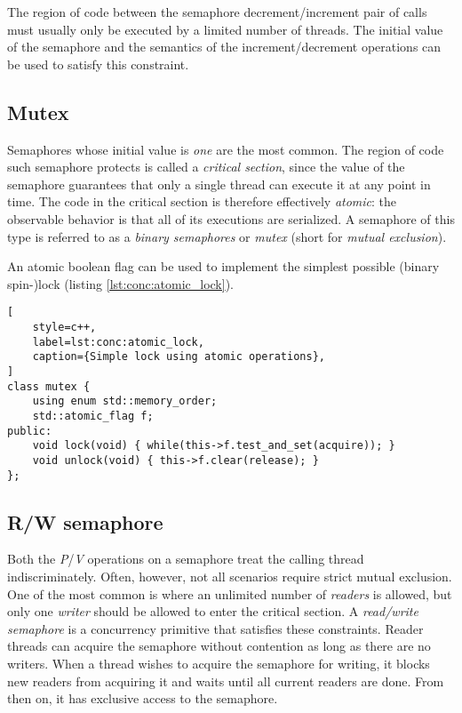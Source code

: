 The region of code between the semaphore decrement/increment pair of calls must
usually only be executed by a limited number of threads.  The initial value of
the semaphore and the semantics of the increment/decrement operations can be
used to satisfy this constraint.

\subsection{Mutex}

\label{subsec:conc:mutex}

Semaphores whose initial value is \emph{one} are the most common.  The region of
code such semaphore protects is called a \textit{critical section}, since the
value of the semaphore guarantees that only a single thread can execute it at
any point in time.  The code in the critical section is therefore effectively
\emph{atomic}: the observable behavior is that all of its executions are
serialized.  A semaphore of this type is referred to as a \textit{binary
semaphores} or \textit{mutex} (short for \textit{mutual exclusion}).

An atomic boolean flag can be used to implement the simplest possible (binary
spin-)lock (listing \ref{lst:conc:atomic_lock}).

\begin{lstlisting}[
    style=c++,
    label=lst:conc:atomic_lock,
    caption={Simple lock using atomic operations},
]
class mutex {
    using enum std::memory_order;
    std::atomic_flag f;
public:
    void lock(void) { while(this->f.test_and_set(acquire)); }
    void unlock(void) { this->f.clear(release); }
};
\end{lstlisting}

\subsection{R/W semaphore}

Both the \textit{P}/\textit{V} operations on a semaphore treat the calling
thread indiscriminately.  Often, however, not all scenarios require strict
mutual exclusion.  One of the most common is where an unlimited number of
\emph{readers} is allowed, but only one \emph{writer} should be allowed to enter
the critical section.  A \textit{read/write semaphore} is a concurrency
primitive that satisfies these constraints.  Reader threads can acquire the
semaphore without contention as long as there are no writers.  When a thread
wishes to acquire the semaphore for writing, it blocks new readers from
acquiring it and waits until all current readers are done.  From then on, it has
exclusive access to the semaphore.

